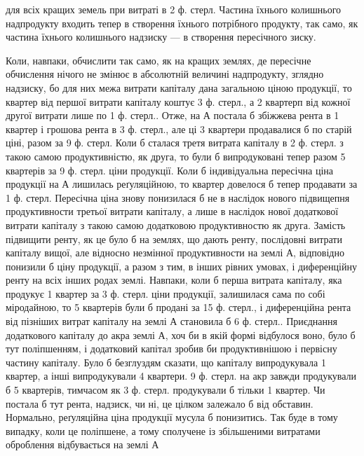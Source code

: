 \parcont{}  %
для всіх кращих земель при витраті в 2   ф. стерл. Частина їхнього колишнього
надпродукту входить тепер в створення їхнього потрібного продукту, так
само, як частина їхнього колишнього надзиску — в створення пересічного зиску.

Коли, навпаки, обчислити так само, як на кращих землях, де пересічне обчислення
нічого не змінює в абсолютній величині надпродукту, зглядно надзиску, бо для
них межа витрати капіталу дана загальною ціною продукції, то квартер від першої
витрати капіталу коштує 3 ф. стерл., а 2 квартерп від кожної другої витрати
лише по 1   ф. стерл.. Отже, на А постала б збіжжева рента в 1 квартер
і грошова рента в 3 ф. стерл., але ці 3 квартери продавалися б по старій
ціні, разом за 9 ф. стерл. Коли б сталася третя витрата капіталу в 2   ф.
стерл. з такою самою продуктивністю, як друга, то були б випродуковані тепер
разом 5 квартерів за 9 ф. стерл. ціни продукції. Коли б індивідуальна
пересічна ціна продукції на А лишилась реґуляційною, то квартер довелося б
тепер продавати за 1   ф. стерл. Пересічна ціна знову понизилася б не в
наслідок нового підвищепня продуктивности третьої витрати капіталу, а лише в
наслідок нової додаткової витрати капіталу з такою самою додатковою продуктивностю
як друга. Замість підвищити ренту, як це було б на землях, що дають
ренту, послідовні витрати капіталу вищої, але відносно незмінної продуктивности
на землі А, відповідно понизили б ціну продукції, а разом з тим, в інших
рівних умовах, і диференційну ренту на всіх інших родах землі. Навпаки,
коли б перша витрата капіталу, яка продукує 1 квартер за 3 ф. стерл. ціни
продукції, залишилася сама по собі міродайною, то 5 квартерів були б продані
за 15 ф. стерл., і диференційна рента від пізніших витрат капіталу на землі
А становила б 6 ф. стерл.. Приєднання додаткового капіталу до акра землі А,
хоч би в якій формі відбулося воно, було б тут поліпшенням, і додатковий
капітал зробив би продуктивнішою і первісну частину капіталу. Було б безглуздям
сказати, що   капіталу випродукувала 1 квартер, а інші  випродукували
4 квартери. 9 ф. стерл. на акр завжди продукували б 5 квартерів, тимчасом
як 3 ф. стерл. продукували б тільки 1 квартер. Чи постала б тут рента, надзиск,
чи ні, це цілком залежало б від обставин. Нормально, реґуляційна ціна
продукції мусула б понизитись. Так буде в тому випадку, коли це поліпшене,
а тому сполучене із збільшеними витратами оброблення відбувається на землі А
